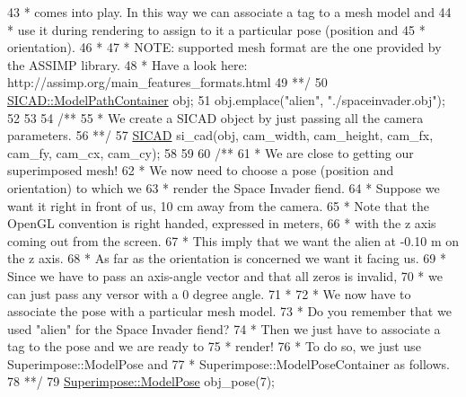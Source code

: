 \begin{DoxyCodeInclude}
43 \textcolor{comment}{     * comes into play. In this way we can associate a tag to a mesh model and}
44 \textcolor{comment}{     * use it during rendering to assign to it a particular pose (position and}
45 \textcolor{comment}{     * orientation).}
46 \textcolor{comment}{     *}
47 \textcolor{comment}{     * NOTE: supported mesh format are the one provided by the ASSIMP library.}
48 \textcolor{comment}{     *       Have a look here: http://assimp.org/main\_features\_formats.html}
49 \textcolor{comment}{     **/}
50     \mbox{\hyperlink{classSICAD_a9e1e1460d4c0f331b4fd015aae4dd721}{SICAD::ModelPathContainer}} obj;
51     obj.emplace(\textcolor{stringliteral}{"alien"}, \textcolor{stringliteral}{"./spaceinvader.obj"});
52 
53 \textcolor{comment}{}
54 \textcolor{comment}{    /**}
55 \textcolor{comment}{     * We create a SICAD object by just passing all the camera parameters.}
56 \textcolor{comment}{     **/}
57     \mbox{\hyperlink{classSICAD}{SICAD}} si\_cad(obj, cam\_width, cam\_height, cam\_fx, cam\_fy, cam\_cx, cam\_cy);
58 
59 \textcolor{comment}{}
60 \textcolor{comment}{    /**}
61 \textcolor{comment}{     * We are close to getting our superimposed mesh!}
62 \textcolor{comment}{     * We now need to choose a pose (position and orientation) to which we}
63 \textcolor{comment}{     * render the Space Invader fiend.}
64 \textcolor{comment}{     * Suppose we want it right in front of us, 10 cm away from the camera.}
65 \textcolor{comment}{     * Note that the OpenGL convention is right handed, expressed in meters,}
66 \textcolor{comment}{     * with the z axis coming out from the screen.}
67 \textcolor{comment}{     * This imply that we want the alien at -0.10 m on the z axis.}
68 \textcolor{comment}{     * As far as the orientation is concerned we want it facing us.}
69 \textcolor{comment}{     * Since we have to pass an axis-angle vector and that all zeros is invalid,}
70 \textcolor{comment}{     * we can just pass any versor with a 0 degree angle.}
71 \textcolor{comment}{     *}
72 \textcolor{comment}{     * We now have to associate the pose with a particular mesh model.}
73 \textcolor{comment}{     * Do you remember that we used "alien" for the Space Invader fiend?}
74 \textcolor{comment}{     * Then we just have to associate a tag to the pose and we are ready to}
75 \textcolor{comment}{     * render!}
76 \textcolor{comment}{     * To do so, we just use Superimpose::ModelPose and}
77 \textcolor{comment}{     * Superimpose::ModelPoseContainer as follows.}
78 \textcolor{comment}{     **/}
79     \mbox{\hyperlink{classSuperimpose_a85d40a5caf19f486d1e0c15c0a025378}{Superimpose::ModelPose}} obj\_pose(7);

\end{DoxyCodeInclude}
